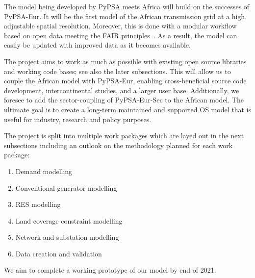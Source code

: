 \documentclass[conference, a4paper]{IEEEtran}
\begin{document}
The model being developed by PyPSA meets Africa will build on the successes of PyPSA-Eur.
It will be the first model of the African transmission grid at a high, adjustable spatial resolution.
Moreover, this is done with a modular workflow based on open data meeting the FAIR principles~\cite{wilkinson-dumontier-ea-2016}.
As a result, the model can easily be updated with improved data as it becomes available.

The project aims to work as much as possible with existing open source libraries and working code bases; see also the later subsections.
This will allow us to couple the African model with PyPSA-Eur, enabling cross-beneficial source code development, intercontinental studies, and a larger user base.
Additionally, we foresee to add the sector-coupling of PyPSA-Eur-Sec to the African model.
The ultimate goal is to create a long-term maintained and supported OS model that is useful for industry, research and policy purposes.




The project is split into multiple work packages which are layed out in the next subsections including an outlook on the methodology planned for each work package:

\begin{enumerate}
    \item Demand modelling
    \item Conventional generator modelling
    \item RES modelling
    \item Land coverage constraint modelling
    \item Network and substation modelling
    \item Data creation and validation 
\end{enumerate}

We aim to complete a working prototype of our model by end of 2021.
\end{document}

